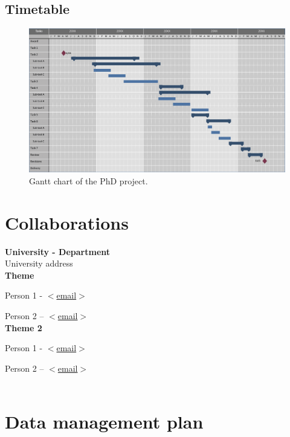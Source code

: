 \documentclass[a4paper,12pt]{article}
\begin{document}
    \newpage
 	\begin{landscape}
	\thispagestyle{mylandscape}
	\vspace*{-3cm}
	\section{Timetable} 
    \begin{figure}[!htb]\vspace*{-0.4cm}
    \centerline{
    \includegraphics[scale=0.67]{../figures/gantt_template.png}
    }
    \caption{Gantt chart of the PhD project.}
    \label{fig:gantt}
    \end{figure}
    \end{landscape}
    

 		
	\newpage
	\section{Collaborations}
	\vspace*{1 cm}
    \noindent \textbf{University - Department}\\
    
    \noindent University address\\

\textbf{Theme}

    Person 1 - \href{mailto:<email>}{$<$email$>$} \\ \vspace*{-5.5mm}
    
    Person 2 – \href{mailto:<email>}{$<$email$>$} \\

\textbf{Theme 2}

    Person 1 - \href{mailto:<email>}{$<$email$>$} \\ \vspace*{-5.5mm}

    Person 2 – \href{mailto:<email>}{$<$email$>$} \\\\ 
   
    
	\section{Data management plan}
	
	\newpage
	
	
\end{document}
